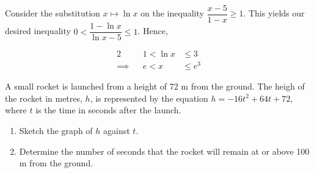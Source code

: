 \documentclass{jhwhw}
\begin{document}
        \begin{center}
        \end{center}


        Consider the substitution $x \mapsto \ln x$ on the inequality $\dfrac{x-5}{1-x} \geq 1$. This yields our desired inequality $0 < \dfrac{1-\ln x}{\ln x -5} \leq 1$. Hence, 

        \begin{alignat*}{2}
            &&1 < \ln x &\leq 3 \\
            \implies&& e < x &\leq e^3
        \end{alignat*}


    \problem{}
        A small rocket is launched from a height of 72 m from the ground. The heigh of the rocket in metres, $h$, is represented by the equation $h = -16t^2 + 64t+72$, where $t$ is the time in seconds after the launch.

        \begin{enumerate}
            \item Sketch the graph of $h$ against $t$.
            \item Determine the number of seconds that the rocket will remain at or above 100 m from the ground.
        \end{enumerate}

    \solution
\end{document}
